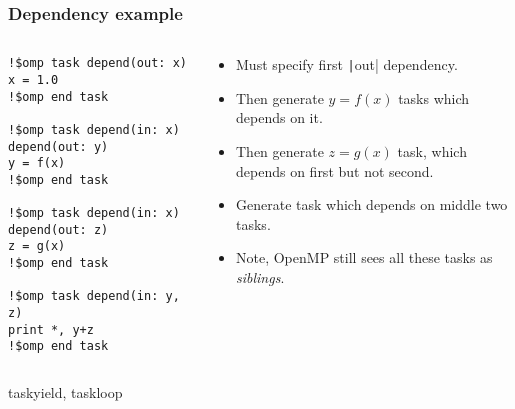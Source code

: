 \documentclass{beamer}
\begin{document}
\begin{frame}[fragile]
\frametitle{Dependency example}
\begin{columns}
\begin{column}{0.5\textwidth}
\begin{verbatim}
!$omp task depend(out: x)
x = 1.0
!$omp end task

!$omp task depend(in: x) depend(out: y)
y = f(x)
!$omp end task

!$omp task depend(in: x) depend(out: z)
z = g(x)
!$omp end task

!$omp task depend(in: y, z)
print *, y+z
!$omp end task
\end{verbatim}
\end{column}

\begin{column}{0.5\textwidth}
\begin{itemize}
  \item Must specify first \texttt|out| dependency.
  \item Then generate $y=f(x)$ tasks which depends on it.
  \item Then generate $z=g(x)$ task, which depends on first but not second.
  \item Generate task which depends on middle two tasks.
  \item Note, OpenMP still sees all these tasks as \emph{siblings}.
\end{itemize}
\end{column}
\end{columns}

\end{frame}

\begin{frame}
taskyield, taskloop
\end{frame}
\end{document}

